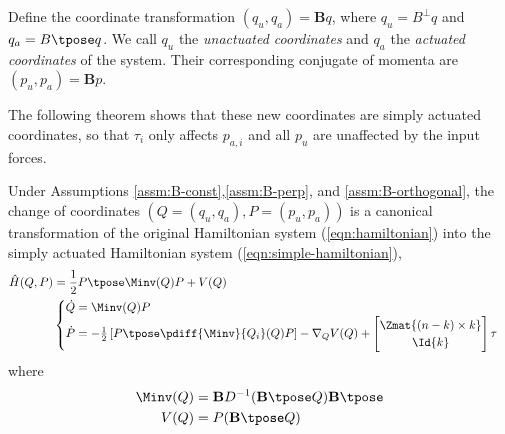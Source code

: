 \begin{defn}
    Define the coordinate transformation 
    \((q_u,q_a) = \mathbf{B}q\), where \(q_u = B^\perp q\)
    and \(q_a = B\tpose q\).
    We call \(q_u\) the \textit{unactuated coordinates} and \(q_a\) the
    \textit{actuated coordinates} of the system. 
    Their corresponding conjugate of momenta are 
    \((p_u,p_a) = \mathbf{B}p\).
\end{defn}

The following theorem shows that these new coordinates are simply actuated
coordinates, so that \(\tau_i\) only affects \(p_{a,i}\)
and all \(p_u\) are unaffected by the input forces. 

\begin{thm}
    Under Assumptions \ref{assm:B-const},\ref{assm:B-perp}, and
    \ref{assm:B-orthogonal}, the change of coordinates 
    \((Q = (q_u, q_a), P = (p_u,p_a))\) 
    is a canonical transformation of the
    original Hamiltonian system (\ref{eqn:hamiltonian}) into
    the simply actuated Hamiltonian system (\ref{eqn:simple-hamiltonian}),
    \begin{align}\label{eqn:simple-hamiltonian}
        \hat{H}(Q,P) &= 
        \frac{1}{2} P\tpose \Minv(Q) P + V(Q) \\
       &\begin{cases}
            \dot{Q} = \Minv(Q)P \\
            \dot{P} = -\frac{1}{2}
                \left[P\tpose \pdiff{\Minv}{Q_i}(Q) P \right] 
                - \nabla_Q V(Q) + 
                \begin{bmatrix}
                    \Zmat{(n-k)\times k} \\
                    \Id{k} \\
                \end{bmatrix} \tau
        \end{cases} \nonumber
    \end{align}
    where
    \begin{align*}
        \Minv(Q) &= \mathbf{B}D^{-1}(\mathbf{B}\tpose Q)\mathbf{B}\tpose \\
        V(Q) &= P(\mathbf{B}\tpose Q) \\
    \end{align*}
\end{thm}
